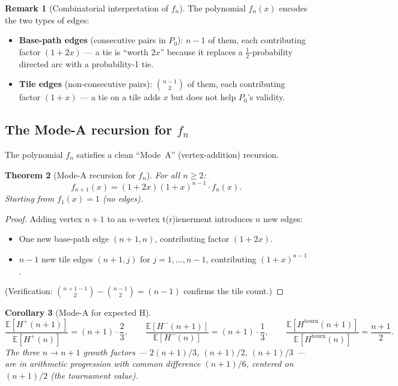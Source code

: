 \documentclass[12pt,reqno]{amsart}
\newtheorem{theorem}{Theorem}[section]
\newtheorem{corollary}[theorem]{Corollary}
\theoremstyle{definition}
\newtheorem{remark}[theorem]{Remark}
\theoremstyle{plain}
\begin{document}
\begin{remark}[Combinatorial interpretation of $f_n$]
The polynomial $f_n(x)$ encodes the two types of edges:
\begin{itemize}
\item \textbf{Base-path edges} (consecutive pairs in $P_0$): $n-1$ of them,
  each contributing factor $(1+2x)$ — a tie is ``worth $2x$'' because it
  replaces a $\frac{1}{2}$-probability directed arc with a probability-1 tie.
\item \textbf{Tile edges} (non-consecutive pairs): $\binom{n-1}{2}$ of them,
  each contributing factor $(1+x)$ — a tie on a tile adds $x$ but does not
  help $P_0$'s validity.
\end{itemize}
\end{remark}

\subsection{The Mode-A recursion for \texorpdfstring{$f_n$}{f\_n}}
\label{ssec:mode-a}

The polynomial $f_n$ satisfies a clean ``Mode~A'' (vertex-addition) recursion.

\begin{theorem}[Mode-A recursion for $f_n$]\label{thm:mode-a}
For all $n\ge 2$:
\[
  f_{n+1}(x)=(1+2x)(1+x)^{n-1}\cdot f_n(x).
\]
Starting from $f_1(x)=1$ (no edges).
\end{theorem}

\begin{proof}
Adding vertex $n+1$ to an $n$-vertex t(r)ienerment introduces $n$ new edges:
\begin{itemize}
\item One new base-path edge $(n+1,n)$, contributing factor $(1+2x)$.
\item $n-1$ new tile edges $(n+1,j)$ for $j=1,\ldots,n-1$, contributing $(1+x)^{n-1}$.
\end{itemize}
(Verification: $\binom{n+1-1}{2}-\binom{n-1}{2}=(n-1)$ confirms the tile count.)
\end{proof}

\begin{corollary}[Mode-A for expected H]
\[
  \frac{\mathbb{E}[H^+(n+1)]}{\mathbb{E}[H^+(n)]}
  =(n+1)\cdot\frac{2}{3},
  \qquad
  \frac{\mathbb{E}[H^-(n+1)]}{\mathbb{E}[H^-(n)]}
  =(n+1)\cdot\frac{1}{3},
  \qquad
  \frac{\mathbb{E}[H^{\mathrm{tourn}}(n+1)]}{\mathbb{E}[H^{\mathrm{tourn}}(n)]}
  =\frac{n+1}{2}.
\]
The three $n\to n+1$ growth factors — $2(n+1)/3$, $(n+1)/2$, $(n+1)/3$ —
are in arithmetic progression with common difference $(n+1)/6$, centered on
$(n+1)/2$ (the tournament value).
\end{corollary}
\end{document}
